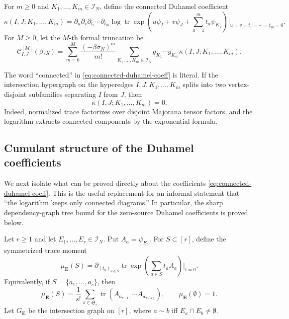 \documentclass[11pt]{article}
\newcommand{\tr}{\operatorname{tr}}
\newcommand{\calI}{\mathcal{I}}
\begin{document}
For $m\geq0$ and $K_1,\ldots,K_m\in\calI_N$, define the connected Duhamel
coefficient
\begin{equation}\label{eq:connected-duhamel-coeff}
  \kappa(I,J;K_1,
  \ldots,K_m)
  =
  \partial_u\partial_v\partial_{t_1}\cdots\partial_{t_m}
  \log\tr\exp\left(
    u\psi_I+v\psi_J+
    \sum_{a=1}^m t_a\psi_{K_a}
  \right)\bigg|_{u=v=t_1=\cdots=t_m=0}.
\end{equation}
For $M\geq0$, let the $M$-th formal truncation be
\begin{equation}\label{eq:truncated-connected-expansion}
  \mathcal C^{[M]}_{I,J}(\beta,g)
  =
  \sum_{m=0}^M
  \frac{(-\beta\sigma_N)^m}{m!}
  \sum_{K_1,
  \ldots,K_m\in\calI_N}
  g_{K_1}\cdots g_{K_m}
  \kappa(I,J;K_1,
  \ldots,K_m).
\end{equation}

The word ``connected'' in \eqref{eq:connected-duhamel-coeff} is literal.  If the
intersection hypergraph on the hyperedges $I,J,K_1,\ldots,K_m$ splits into two
vertex-disjoint subfamilies separating $I$ from $J$, then
\begin{equation}\label{eq:connected-vanishing}
  \kappa(I,J;K_1,
  \ldots,K_m)=0.
\end{equation}
Indeed, normalized trace factorizes over disjoint Majorana tensor factors, and
the logarithm extracts connected components by the exponential formula.

\subsection{Cumulant structure of the Duhamel coefficients}
\label{subsec:duhamel-cumulant-structure}

We next isolate what can be proved directly about the coefficients
\eqref{eq:connected-duhamel-coeff}.  This is the useful replacement for an
informal statement that ``the logarithm keeps only connected diagrams.''  In
particular, the sharp dependency-graph tree bound for the zero-source
Duhamel coefficients is proved below.

Let $r\geq1$ and let $E_1,\ldots,E_r\in\calI_N$.  Put
$A_a=\psi_{E_a}$.  For $S\subset[r]$, define the symmetrized trace moment
\begin{equation}\label{eq:sym-trace-moment}
  \mu_{\mathbf E}(S)
  =
  \partial_{(t_a)_{a\in S}}
  \tr\exp\left(\sum_{a\in S}t_aA_a\right)\bigg|_{t=0}.
\end{equation}
Equivalently, if $S=\{a_1,\ldots,a_s\}$, then
\begin{equation}\label{eq:sym-trace-moment-permutation}
  \mu_{\mathbf E}(S)
  =
  \frac1{s!}
  \sum_{\pi\in\mathfrak S_s}
  \tr\left(A_{a_{\pi(1)}}\cdots A_{a_{\pi(s)}}\right),
  \qquad
  \mu_{\mathbf E}(\emptyset)=1.
\end{equation}
Let $G_{\mathbf E}$ be the intersection graph on $[r]$, where $a\sim b$ iff
$E_a\cap E_b\neq\emptyset$.
\end{document}
